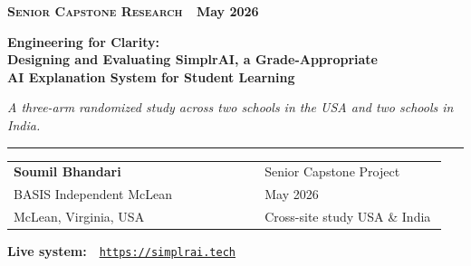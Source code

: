 \documentclass[11pt,letterpaper]{article}
\title{}
\author{}
\date{}
\begin{document}
{\footnotesize\sffamily\color{accent2}\textbf{\textsc{Senior Capstone Research} \,\textbullet\, May 2026}}

\vspace{0.4em}

{\sffamily\bfseries\fontsize{22pt}{26pt}\selectfont\color{accent}%
Engineering for Clarity:\\[0.15em]
Designing and Evaluating SimplrAI, a Grade-Appropriate\\
AI Explanation System for Student Learning\par}

\vspace{0.4em}
{\sffamily\itshape\color{softgray}A three-arm randomized study across two schools in the USA and two schools in India.}

\vspace{0.7em}
{\color{accent}\rule{\linewidth}{1.0pt}}
\vspace{0.5em}

\begin{tabular}{@{}p{0.55\linewidth}p{0.40\linewidth}@{}}
{\sffamily\bfseries\large Soumil Bhandari} & {\sffamily\small\color{softgray}Senior Capstone Project} \\
{\small\color{softgray}BASIS Independent McLean} & {\sffamily\small\color{softgray}May 2026} \\
{\small\color{softgray}McLean, Virginia, USA} & {\sffamily\small\color{softgray}Cross-site study \textbullet{} USA \& India} \\
\end{tabular}

\vspace{0.8em}
\textbf{Live system:}\ \ \href{https://simplrai.tech}{\color{accent}\texttt{https://simplrai.tech}}
\vspace{0.6em}
\end{document}
